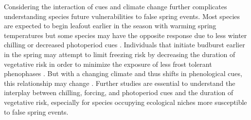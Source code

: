 \documentclass{article}\usepackage[]{graphicx}\usepackage[]{color}
\begin{document}
Considering the interaction of cues and climate change further complicates understanding species future vulnerabilities to false spring events. Most species are expected to begin leafout earlier in the season with warming spring temperatures but some species may have the opposite response due to less winter chilling or decreased photoperiod cues \citep{Cleland2006, Fu2015, Xin2016}. %
Individuals that initiate budburst earlier in the spring may attempt to limit freezing risk by decreasing the duration of vegetative risk in order to minimize the exposure of less frost tolerant phenophases \citep{Augspurger2009}. But with a changing climate and thus shifts in phenological cues, this relationship may change \citep{Dolezal2016}. Further studies are essential to understand the interplay between chilling, forcing, and photoperiod cues and the duration of vegetative risk, especially for species occupying ecological niches more susceptible to false spring events. 


\end{document}
